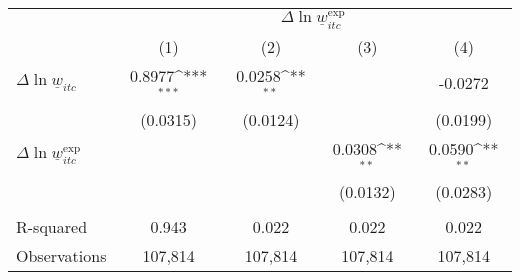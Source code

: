 {
\def\sym#1{\ifmmode^{#1}\else\(^{#1}\)\fi}
\begin{tabular}{l*{4}{c}}
\hline\hline
          &\multicolumn{4}{c}{$\Delta \ln \underline{w}_{itc}^{\text{exp}}$}          \\\cmidrule(lr){2-5}
          &\multicolumn{1}{c}{(1)}         &\multicolumn{1}{c}{(2)}         &\multicolumn{1}{c}{(3)}         &\multicolumn{1}{c}{(4)}         \\
\hline
$\Delta \ln \underline{w}_{itc}$&   0.8977\sym{***}&   0.0258\sym{**} &                  &  -0.0272         \\
          & (0.0315)         & (0.0124)         &                  & (0.0199)         \\
[1em]
$\Delta \ln \underline{w}_{itc}^{\text{exp}}$&                  &                  &   0.0308\sym{**} &   0.0590\sym{**} \\
          &                  &                  & (0.0132)         & (0.0283)         \\
\hline
\vspace{-2mm}&                  &                  &                  &                  \\
R-squared &    0.943         &    0.022         &    0.022         &    0.022         \\
Observations&  107,814         &  107,814         &  107,814         &  107,814         \\
\hline\hline
\end{tabular}
}
